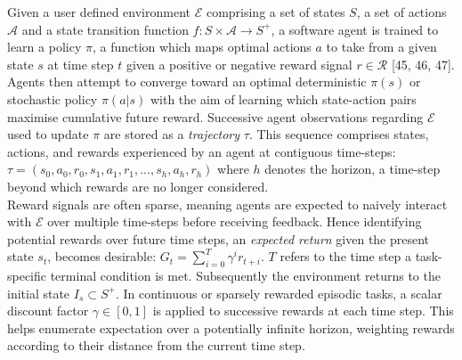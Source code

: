 \documentclass[runningheads]{llncs}
\begin{document}
Given a user defined environment $\mathcal{E}$ comprising a set of states $S$, a set of actions $\mathcal{A}$ and a state transition function $f: S \times \mathcal{A} \to S^+$, a software agent is trained to learn a policy $\pi$, a function which maps optimal actions $a$ to take from a given state $s$ at time step $t$ given a positive or negative reward signal $r \in \mathcal{R}$ [45, 46, 47]. Agents then attempt to converge toward an optimal deterministic $\pi(s)$ or stochastic policy $\pi(a|s)$ with the aim of learning which state-action pairs maximise cumulative future reward. Successive agent observations regarding $\mathcal{E}$ used to update $\pi$ are stored as a \textit{trajectory} $\tau$. This sequence comprises states, actions, and rewards experienced by an agent at contiguous time-steps:
\begin{math}
	\tau = (s_0, a_0, r_0, s_1,a_1,r_1,...,s_h,a_h,r_h)
\end{math}
where $h$ denotes the horizon, a time-step beyond which rewards are no longer considered. \\

Reward signals are often sparse, meaning agents are expected to naively interact with $\mathcal{E}$ over multiple time-steps before receiving feedback. Hence identifying potential rewards over future time steps, an \textit{expected return} given the present state $s_t$, becomes desirable: \begin{math}
	G_t = \sum_{i=0}^{T} \gamma^{i}r_{t+i}.
\end{math}
$T$ refers to the time step a task-specific terminal condition is met. Subsequently the environment returns to the initial state $I_s \subset S^+ $. In continuous or sparsely rewarded episodic tasks, a scalar discount factor $\gamma \in [0,1]$ is applied to successive rewards at each time step. This helps enumerate expectation over a potentially infinite horizon, weighting rewards according to their distance from the current time step. \\
\end{document}
